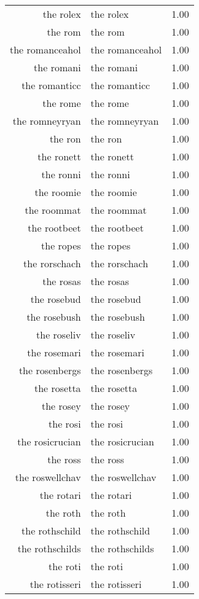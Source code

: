 \begin{table}[ht]
\begin{tabular}{rlr}
  the rolex & the rolex & 1.00 \\ 
  the rom & the rom & 1.00 \\ 
  the romanceahol & the romanceahol & 1.00 \\ 
  the romani & the romani & 1.00 \\ 
  the romanticc & the romanticc & 1.00 \\ 
  the rome & the rome & 1.00 \\ 
  the romneyryan & the romneyryan & 1.00 \\ 
  the ron & the ron & 1.00 \\ 
  the ronett & the ronett & 1.00 \\ 
  the ronni & the ronni & 1.00 \\ 
  the roomie & the roomie & 1.00 \\ 
  the roommat & the roommat & 1.00 \\ 
  the rootbeet & the rootbeet & 1.00 \\ 
  the ropes & the ropes & 1.00 \\ 
  the rorschach & the rorschach & 1.00 \\ 
  the rosas & the rosas & 1.00 \\ 
  the rosebud & the rosebud & 1.00 \\ 
  the rosebush & the rosebush & 1.00 \\ 
  the roseliv & the roseliv & 1.00 \\ 
  the rosemari & the rosemari & 1.00 \\ 
  the rosenbergs & the rosenbergs & 1.00 \\ 
  the rosetta & the rosetta & 1.00 \\ 
  the rosey & the rosey & 1.00 \\ 
  the rosi & the rosi & 1.00 \\ 
  the rosicrucian & the rosicrucian & 1.00 \\ 
  the ross & the ross & 1.00 \\ 
  the roswellchav & the roswellchav & 1.00 \\ 
  the rotari & the rotari & 1.00 \\ 
  the roth & the roth & 1.00 \\ 
  the rothschild & the rothschild & 1.00 \\ 
  the rothschilds & the rothschilds & 1.00 \\ 
  the roti & the roti & 1.00 \\ 
  the rotisseri & the rotisseri & 1.00 \\ 

\end{tabular}
\end{table}
